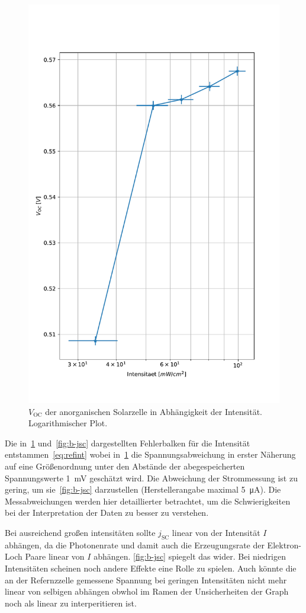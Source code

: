 \documentclass[slug=SZ, room=Hermann-Krone-Bau\,\ Labor\ 1.25, supervisor=Martin\ Kroll]{../../Lab_Report_LaTeX/lab_report}
\newcommand{\voc}{V_{\text{OC}}}
\newcommand{\jsc}{j_{\text{SC}}}
\begin{document}
\begin{figure}[H]\centering
  \includegraphics[width=.7\columnwidth]{./figs/python/B/u_cc.pdf}
  \caption{\(\voc\) der anorganischen Solarzelle in
    Abhängigkeit der Intensität. Logarithmischer Plot.}
  \label{fig:b-voc}
\end{figure}


Die in~\ref{fig:b-voc} und~\ref{fig:b-jsc} dargestellten Fehlerbalken
f\"ur die Intensit\"at entstammen~\ref{eq:refint} wobei
in~\ref{fig:b-voc} die Spannungsabweichung in erster N\"aherung auf
eine Gr\"o\ss{}enordnung unter den Abst\"ande der abegespeicherten
Spannungswerte \SI{1}{\milli\volt} gesch\"atzt wird. Die Abweichung
der Strommessung ist zu gering, um sie~\ref{fig:b-jsc} darzustellen
(Herstellerangabe maximal \SI{5}{\micro\ampere}). Die Messabweichungen
werden hier detaillierter betrachtet, um die Schwierigkeiten bei der
Interpretation der Daten zu besser zu verstehen.

Bei ausreichend gro\ss{}en intensit\"aten sollte \(\jsc\) linear von
der Intensit\"at \(I\) abh\"angen, da die Photonenrate und damit auch
die Erzeugungsrate der Elektron-Loch Paare linear von \(I\)
abh\"angen. \ref{fig:b-jsc} spiegelt das wider. Bei niedrigen
Intensit\"aten scheinen noch andere Effekte eine Rolle zu
spielen. Auch k\"onnte die an der Refernzzelle gemessene Spannung bei
geringen Intensit\"aten nicht mehr linear von selbigen abh\"angen
obwhol im Ramen der Unsicherheiten der Graph noch als linear zu
interperitieren ist.
\end{document}
